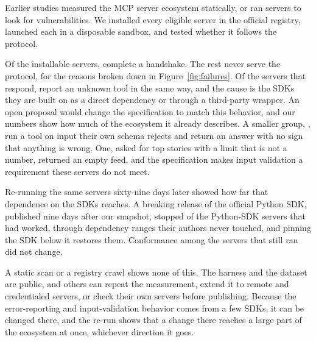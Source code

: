 Earlier studies measured the MCP server ecosystem statically, or ran servers to look
for vulnerabilities. We installed every eligible server in the official registry,
launched each in a disposable sandbox, and tested whether it follows the protocol.

Of the installable servers, \HandshakeRateCorr{} complete a handshake. The rest
never serve the protocol, for the
reasons broken down in Figure~\ref{fig:failures}. Of the servers that respond,
\ErrAsResultRateCl{} report an unknown tool in the same way, and the cause is the SDKs
they are built on as a direct dependency or through a third-party wrapper.
An open proposal would change the specification to match this behavior, and our
numbers show how much of the ecosystem it already describes. A smaller group,
\SilentExecRateCl{}, run a tool on input their own schema rejects and return an answer
with no sign that anything is wrong. One, asked for top stories with a limit that is
not a number, returned an empty feed, and the specification makes input validation a
requirement these servers do not meet.

Re-running the same servers sixty-nine days later showed how far that dependence on
the SDKs reaches. A breaking release of the official Python SDK, published nine days
after our snapshot, stopped \PySDKLostRate{} of the Python-SDK servers that had worked,
through dependency ranges their authors never touched, and pinning the SDK below it
restores them. Conformance among the servers that still ran did not change.

A static scan or a registry crawl shows none of this. The harness and the dataset are
public, and others can repeat the measurement, extend it to remote and credentialed
servers, or check their own servers before publishing. Because the error-reporting
and input-validation behavior comes from a few SDKs, it can be changed there, and the
re-run shows that a change there reaches a large part of the ecosystem at once,
whichever direction it goes.
